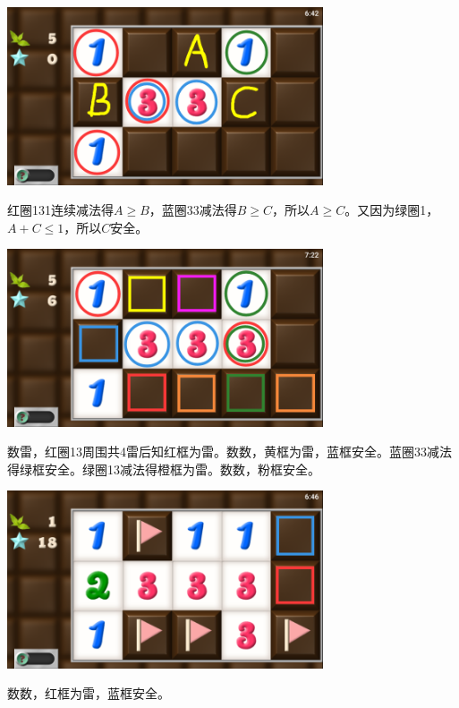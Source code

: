 \subsection{} %
\begin{center}
    \includegraphics[width=0.7\textwidth]{puzzle/108-1.png}
\end{center}
红圈131连续减法得$A\ge B$，蓝圈33减法得$B\ge C$，所以$A\ge C$。又因为绿圈1，$A+C\le 1$，所以$C$安全。
\begin{center}
    \includegraphics[width=0.7\textwidth]{puzzle/108-2.png}
\end{center}
数雷，红圈13周围共4雷后知红框为雷。数数，黄框为雷，蓝框安全。蓝圈33减法得绿框安全。绿圈13减法得橙框为雷。数数，粉框安全。
\begin{center}
    \includegraphics[width=0.7\textwidth]{puzzle/108-3.png}
\end{center}
数数，红框为雷，蓝框安全。

